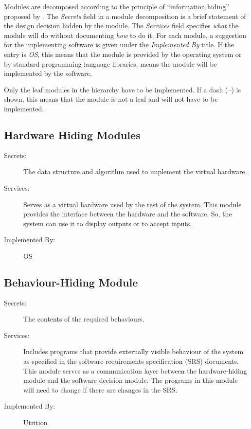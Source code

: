 \documentclass[12pt, titlepage]{article}
\begin{document}
Modules are decomposed according to the principle of ``information hiding''
proposed by \citet{ParnasEtAl1984}. The \emph{Secrets} field in a module
decomposition is a brief statement of the design decision hidden by the
module. The \emph{Services} field specifies \emph{what} the module will do
without documenting \emph{how} to do it. For each module, a suggestion for the
implementing software is given under the \emph{Implemented By} title. If the
entry is \emph{OS}, this means that the module is provided by the operating
system or by standard programming language libraries.  \emph{\progname{}} means the
module will be implemented by the \progname{} software.

Only the leaf modules in the hierarchy have to be implemented. If a dash
(\emph{--}) is shown, this means that the module is not a leaf and will not have
to be implemented.

\subsection{Hardware Hiding Modules}

\begin{description}
\item[Secrets:]The data structure and algorithm used to implement the virtual
  hardware.
\item[Services:]Serves as a virtual hardware used by the rest of the
  system. This module provides the interface between the hardware and the
  software. So, the system can use it to display outputs or to accept inputs.
\item[Implemented By:] OS
\end{description}

\subsection{Behaviour-Hiding Module}

\begin{description}
\item[Secrets:]The contents of the required behaviours.
\item[Services:]Includes programs that provide externally visible behaviour of
  the system as specified in the software requirements specification (SRS)
  documents. This module serves as a communication layer between the
  hardware-hiding module and the software decision module. The programs in this
  module will need to change if there are changes in the SRS.
\item[Implemented By:] Utrition
\end{description}
\end{document}
